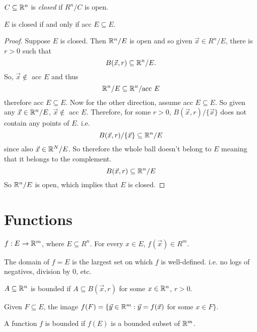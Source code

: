 \documentclass[11pt]{article}
\newcommand{\x}{\vec{x}}
\newcommand{\y}{\vec{y}}
\newcommand{\ra}{\rightarrow}
\begin{document}
\begin{definition} $C \subseteq \mathbb{R}^n$ is \textit{closed} if $R^n /C$ is open. 
\end{definition}

\begin{proposition}
    $E$ is closed if and only if acc $E \subseteq E$. 
    \begin{proof}
        Suppose $E$ is closed. Then $\mathbb{R}^n /E$ is open and so given $\x \in R^n/E$, there is $r > 0$ such that \[B(\x,r) \subseteq \R^n/E.\]
        So, $\x \not \in$ acc $E$ and thus \[\mathbb{R}^n / E \subseteq \mathbb{R}^n / \text{acc} \ E \] 
        therefore acc $E \subseteq E$.  \newpage
        Now for the other direction, assume acc $E \subseteq E$. So given any $\x \in \R^n / E$, $\x \not \in$ acc $E$. Therefore, for some $r > 0$, $B(\x, r) / \{\x\}$ does not contain any points of $E$. i.e.
        \[B(\x,r)/ \{ \x \} \subseteq \R^n / E\]
        since also $\x \in \R^N /E$. So therefore the whole ball doesn't belong to $E$ meaning that it belongs to the complement. 
        \[B(\x, r) \subseteq \R^n / E\]
        So $\mathbb{R}^n / E$ is open, which implies that $E$ is closed.
    \end{proof}
\end{proposition}

\section{Functions}
$f: E \ra \R^m$, where $E \subseteq R^n$. For every $x \in E$, $f(\x) \in R^m$. 
\begin{definition}[Domain]
    The domain of $f = E$ is the largest set on which $f$ is well-defined. i.e. no logs of negatives, division by $0$, etc.
\end{definition}

\begin{definition}
    $A \subseteq \mathbb{R}^n$ is bounded if $A \subseteq B(\x,r)$ for some $x \in \mathbb{R}^n$, $r > 0$.
\end{definition}

\begin{definition}[Images]
    Given $F \subseteq E$, the image $f(F) = \{ \y \in \R^m : \y = f(\x)$ for some $x \in F \}$.
\end{definition}

\begin{definition}
    A function $f$ is bounded if $f(E)$ is a bounded subset of $\mathbb{R}^m$.
\end{definition}
\end{document}
